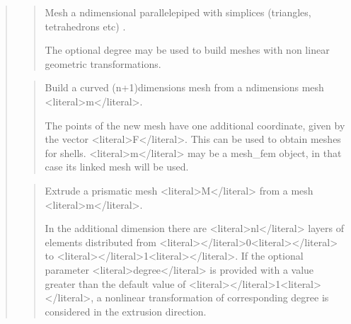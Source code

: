 \documentclass[a4paper,11pt,english]{sphinxmanual}
\begin{document}
\begin{quote}
\sphinxAtStartPar
{}
\begin{quote}

\sphinxAtStartPar
Mesh a n\sphinxhyphen{}dimensional parallelepiped with simplices (triangles,
tetrahedrons etc) .

\sphinxAtStartPar
The optional degree may be used to build meshes with non linear
geometric transformations.
\end{quote}

\sphinxAtStartPar
{}
\begin{quote}

\sphinxAtStartPar
Build a curved (n+1)\sphinxhyphen{}dimensions mesh from a n\sphinxhyphen{}dimensions mesh \textless{}literal\textgreater{}m\textless{}/literal\textgreater{}.

\sphinxAtStartPar
The points of the new mesh have one additional coordinate, given by
the vector \textless{}literal\textgreater{}F\textless{}/literal\textgreater{}. This can be used to obtain meshes for shells. \textless{}literal\textgreater{}m\textless{}/literal\textgreater{} may
be a mesh\_fem object, in that case its linked mesh will be used.
\end{quote}

\sphinxAtStartPar
{}
\begin{quote}

\sphinxAtStartPar
Extrude a prismatic mesh \textless{}literal\textgreater{}M\textless{}/literal\textgreater{} from a mesh \textless{}literal\textgreater{}m\textless{}/literal\textgreater{}.

\sphinxAtStartPar
In the additional dimension there are \textless{}literal\textgreater{}nl\textless{}/literal\textgreater{} layers of elements
distributed from \textless{}literal\textgreater{}\textless{}/literal\textgreater{}0\textless{}literal\textgreater{}\textless{}/literal\textgreater{} to \textless{}literal\textgreater{}\textless{}/literal\textgreater{}1\textless{}literal\textgreater{}\textless{}/literal\textgreater{}.
If the optional parameter \textless{}literal\textgreater{}degree\textless{}/literal\textgreater{} is provided with a value greater
than the default value of \textless{}literal\textgreater{}\textless{}/literal\textgreater{}1\textless{}literal\textgreater{}\textless{}/literal\textgreater{}, a non\sphinxhyphen{}linear transformation of
corresponding degree is considered in the extrusion direction.
\end{quote}


\end{quote}
\end{document}
